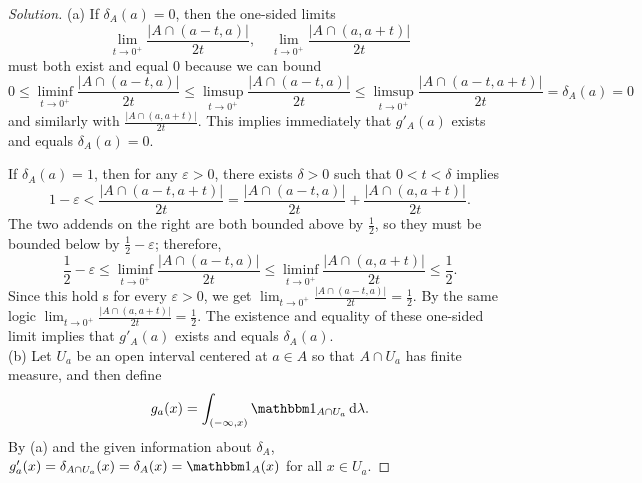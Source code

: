 \documentclass[10pt]{article}
\newcommand{\dd}{\,\mathrm{d}}
\providecommand{\eps}{\varepsilon}
\providecommand{\half}{\frac{1}{2}}
\providecommand{\ind}{\mathbbm 1}
\newenvironment{soln}{\begin{proof}[Solution]}{\end{proof}}
\providecommand{\abs}[1]{\left\lvert #1\right\rvert}
\begin{document}
\begin{soln}
    (a) If $\delta_A(a) = 0$, then the one-sided limits
    \begin{equation*}
	\lim_{t\to0^+} \frac{\abs{A\cap (a-t,a)}}{2t},\quad
	\lim_{t\to0^+} \frac{\abs{A\cap (a,a+t)}}{2t}
    \end{equation*}
    must both exist and equal $0$ because we can bound
    \begin{equation*}
	0\le\liminf_{t\to0^+} \frac{\abs{A\cap(a-t,a)}}{2t} \le
	\limsup_{t\to0^+}\frac{\abs{A\cap(a-t,a)}}{2t}\le
	\limsup_{t\to0^+} \frac{\abs{A\cap(a-t,a+t)}}{2t} = \delta_A(a) = 0
    \end{equation*}
    and similarly with $\frac{\abs{A\cap(a,a+t)}}{2t}$.
    This implies immediately that $g'_A(a)$ exists and equals $\delta_A(a) = 0$.

    If $\delta_A(a) = 1$, then for any $\eps>0$,
    there exists $\delta>0$ such that $0 < t < \delta$ implies
    \begin{equation*}
        1-\eps < \frac{\abs{A\cap (a-t,a+t)}}{2t}
	= \frac{\abs{A\cap (a-t,a)}}{2t} + \frac{\abs{A\cap (a,a+t)}}{2t}.
    \end{equation*}
    The two addends on the right are both bounded above by $\half$,
    so they must be bounded below by $\half - \eps$; therefore,
    \begin{equation*}
	\half - \eps \le\liminf_{t\to0^+} \frac{\abs{A\cap (a-t,a)}}{2t}
	\le \liminf_{t\to0^+} \frac{\abs{A\cap (a,a+t)}}{2t} \le \half.
    \end{equation*}
    Since this hold s for every $\eps>0$,
    we get $\lim_{t\to0^+}\frac{\abs{A\cap (a-t,a)}}{2t} = \half$.
    By the same logic $\lim_{t\to0^+}\frac{\abs{A\cap (a,a+t)}}{2t} = \half$.
    The existence and equality of these one-sided limit
    implies that $g'_A(a)$ exists and equals $\delta_A(a)$.
    \\

    (b) Let $U_a$ be an open interval centered at $a\in A$
    so that $A\cap U_a$ has finite measure, and then define
    \begin{equation*}
	g_a(x) = \int_{(-\infty, x)} \ind_{A\cap U_a}\dd\lambda.
    \end{equation*}
    By (a) and the given information about $\delta_A$,
    $g_a'(x) = \delta_{A\cap U_a}(x) = \delta_A(x) = \ind_A(x)$
    for all $x\in U_a$.


\end{soln}
\end{document}
